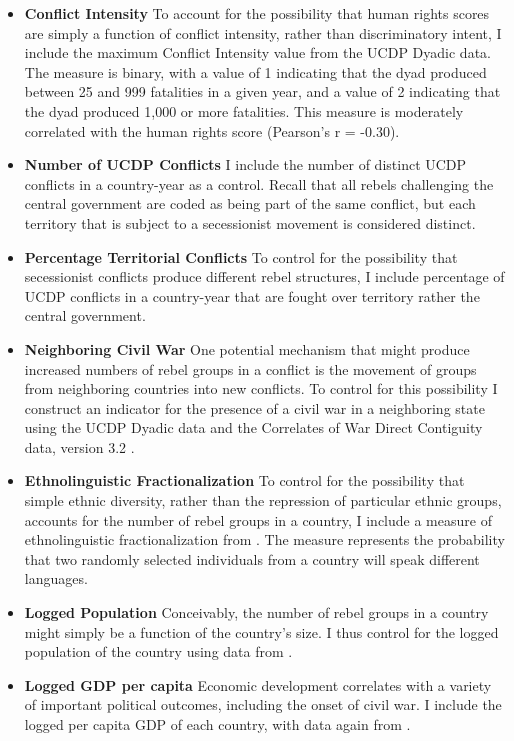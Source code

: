 \documentclass[12pt,]{book}
\providecommand{\tightlist}{%
  \setlength{\itemsep}{0pt}\setlength{\parskip}{0pt}}
\begin{document}
\begin{itemize}
\tightlist
\item
  \textbf{Conflict Intensity} To account for the possibility that human
  rights scores are simply a function of conflict intensity, rather than
  discriminatory intent, I include the maximum Conflict Intensity value
  from the UCDP Dyadic data. The measure is binary, with a value of 1
  indicating that the dyad produced between 25 and 999 fatalities in a
  given year, and a value of 2 indicating that the dyad produced 1,000
  or more fatalities. This measure is moderately correlated with the
  human rights score (Pearson's r = -0.30).
\item
  \textbf{Number of UCDP Conflicts} I include the number of distinct
  UCDP conflicts in a country-year as a control. Recall that all rebels
  challenging the central government are coded as being part of the same
  conflict, but each territory that is subject to a secessionist
  movement is considered distinct.
\item
  \textbf{Percentage Territorial Conflicts} To control for the
  possibility that secessionist conflicts produce different rebel
  structures, I include percentage of UCDP conflicts in a country-year
  that are fought over territory rather the central government.
\item
  \textbf{Neighboring Civil War} One potential mechanism that might
  produce increased numbers of rebel groups in a conflict is the
  movement of groups from neighboring countries into new conflicts. To
  control for this possibility I construct an indicator for the presence
  of a civil war in a neighboring state using the UCDP Dyadic data and
  the Correlates of War Direct Contiguity data, version 3.2
  \citep{Stinnett2002a}.
\item
  \textbf{Ethnolinguistic Fractionalization} To control for the
  possibility that simple ethnic diversity, rather than the repression
  of particular ethnic groups, accounts for the number of rebel groups
  in a country, I include a measure of ethnolinguistic fractionalization
  from \citet{fearonlaitin03}. The measure represents the probability
  that two randomly selected individuals from a country will speak
  different languages.
\item
  \textbf{Logged Population} Conceivably, the number of rebel groups in
  a country might simply be a function of the country's size. I thus
  control for the logged population of the country using data from
  \citet{Gleditsch2002b}.
\item
  \textbf{Logged GDP per capita} Economic development correlates with a
  variety of important political outcomes, including the onset of civil
  war. I include the logged per capita GDP of each country, with data
  again from \citet{Gleditsch2002b}.
\end{itemize}
\end{document}

